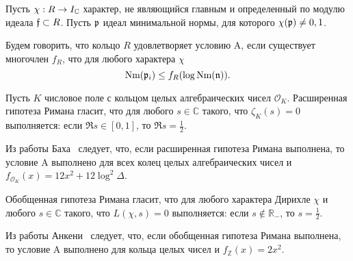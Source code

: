 \documentclass[_00_dissertation.tex]{subfiles}
\begin{document}
\begin{definition}
    Пусть $\chi: R \to I_{\mathbb{C}}$ характер, не являющийся главным и определенный по модулю идеала $\mathfrak{f} \subset R$.
    Пусть $\mathfrak{p}$ идеал минимальной нормы, для которого $\chi(\mathfrak{p}) \neq 0, 1$.
    
    Будем говорить, что кольцо $R$ удовлетворяет условию A, если существует многочлен $f_R$, что для любого характера $\chi$
    \begin{equation*}
        \textrm{Nm}(\mathfrak{p}_i) \le f_R(\log{\textrm{Nm}(\mathfrak{n})}).
    \end{equation*}
\end{definition}

\begin{remark}
    Пусть $K$ числовое поле с кольцом целых алгебраических чисел $\mathcal{O}_K$.
    Расширенная гипотеза Римана гласит, что для любого $s \in \mathbb{C}$ такого, что $\zeta_K(s) = 0$ выполняется: если $\Re{s} \in [0, 1]$, то $\Re{s} = \frac{1}{2}$.

    Из работы Баха~\cite{source:Bach} следует, что, если расширенная гипотеза Римана выполнена, то условие A выполнено для всех колец целых алгебраических чисел и $f_{\mathcal{O}_K}(x) = 12x^2 + 12\log^2 \Delta$.
\end{remark}

\begin{remark}
    Обобщенная гипотеза Римана гласит, что для любого характера Дирихле $\chi$ и любого $s \in \mathbb{C}$ такого, что $L(\chi, s) = 0$ выполняется: если $s \not\in \mathbb{R}_{-}$, то $s = \frac{1}{2}$.

    Из работы Анкени~\cite{source:Ankeny} следует, что, если обобщенная гипотеза Римана выполнена, то условие A выполнено для кольца целых чисел и $f_{\mathbb{Z}}(x) = 2x^2$.
\end{remark}
\end{document}
